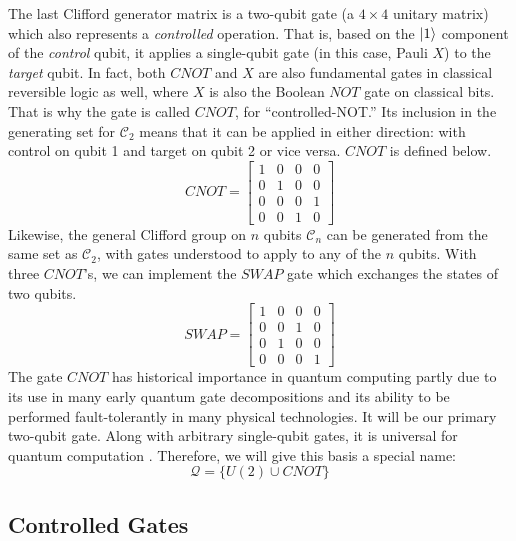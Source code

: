 The last Clifford generator matrix is a two-qubit gate (a $4 \times 4$ unitary matrix) which
also represents a \emph{controlled} operation. That is, based on the
$\left\vert{1}\right\rangle$ component of the \emph{control} qubit, it applies a single-qubit
gate (in this case, Pauli $X$) to the \emph{target} qubit.
In fact,
both $CNOT$ and $X$ are also fundamental gates in classical reversible
logic as well, where $X$ is also the Boolean $NOT$ gate on classical bits.
That is why the gate is called $CNOT$, for ``controlled-NOT.'' Its inclusion
in the generating set for $\mathcal{C}_2$ means that it can be applied
in either direction: with control on qubit 1 and target on qubit 2 or
vice versa. $CNOT$ is defined below.
%
\begin{equation}
CNOT = 
 \left[
  \begin{array}{cccc}
    1 & 0 & 0 & 0 \\
    0 & 1 & 0 & 0 \\
    0 & 0 & 0 & 1 \\
    0 & 0 & 1 & 0
  \end{array} \right]
\end{equation}
%
Likewise, the general Clifford group on $n$ qubits $\mathcal{C}_n$
can be generated from the same set
as $\mathcal{C}_2$, with gates understood to apply to any of the $n$ qubits.
With three $CNOT$'s, we can implement the $SWAP$ gate which exchanges the
states of two qubits.
%
\begin{equation}
SWAP = 
 \left[
  \begin{array}{cccc}
    1 & 0 & 0 & 0 \\
    0 & 0 & 1 & 0 \\
    0 & 1 & 0 & 0 \\
    0 & 0 & 0 & 1
  \end{array} \right]
\end{equation}
%
The gate $CNOT$ has historical importance in quantum computing partly
due to its use in many
early quantum gate decompositions and its ability to
be performed fault-tolerantly in many physical technologies. It will be our
primary two-qubit gate.
Along with arbitrary single-qubit gates, it is universal for quantum computation \cite{Barenco1995a}.
Therefore, we will give this basis a special name:
%
\begin{equation}
\mathcal{Q} = \{ U(2) \cup CNOT \}
\end{equation}

\subsection{Controlled Gates}
\label{subsec:controlled}

